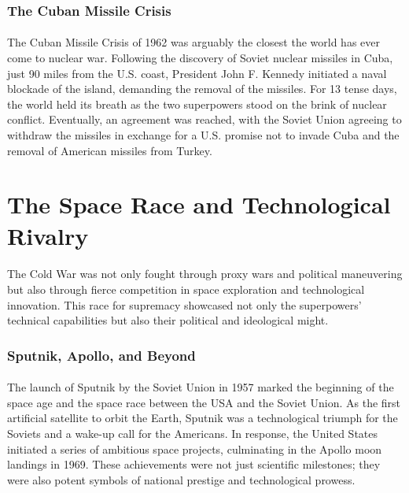 \documentclass[a4paper,12pt]{book}
\begin{document}
\subsubsection*{The Cuban Missile Crisis}
\paragraph{}
The Cuban Missile Crisis of 1962 was arguably the closest the world has ever come to nuclear war. Following the discovery of Soviet nuclear missiles in Cuba, just 90 miles from the U.S. coast, President John F. Kennedy initiated a naval blockade of the island, demanding the removal of the missiles. For 13 tense days, the world held its breath as the two superpowers stood on the brink of nuclear conflict. Eventually, an agreement was reached, with the Soviet Union agreeing to withdraw the missiles in exchange for a U.S. promise not to invade Cuba and the removal of American missiles from Turkey. 

\section*{The Space Race and Technological Rivalry}
\paragraph{}
The Cold War was not only fought through proxy wars and political maneuvering but also through fierce competition in space exploration and technological innovation. This race for supremacy showcased not only the superpowers’ technical capabilities but also their political and ideological might. 

\subsubsection*{Sputnik, Apollo, and Beyond}
\paragraph{}
The launch of Sputnik by the Soviet Union in 1957 marked the beginning of the space age and the space race between the USA and the Soviet Union. As the first artificial satellite to orbit the Earth, Sputnik was a technological triumph for the Soviets and a wake-up call for the Americans. In response, the United States initiated a series of ambitious space projects, culminating in the Apollo moon landings in 1969. These achievements were not just scientific milestones; they were also potent symbols of national prestige and technological prowess. 
\end{document}
